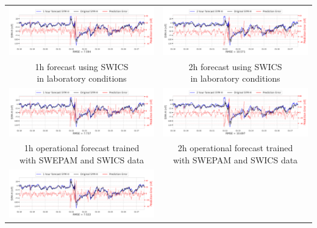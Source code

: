 \documentclass[draft,sw]{agutexSI2019}
\begin{document}
\begin{table}
\centering
\begin{tabular}{cc}
\includegraphics[width=0.49\linewidth]{paper_plots_shade/1h_swics/1h_swics_storm_36.png}
&
\includegraphics[width=0.49\linewidth]{paper_plots_shade/2h_swics/2h_swics_storm_36.png}
\\
\shortstack{1h forecast using SWICS\\ in laboratory conditions} & \shortstack{2h forecast using SWICS\\ in laboratory conditions}
\vspace*{12pt}
\\
\includegraphics[width=0.49\linewidth]{paper_plots_shade/1h_swics_rt/1h_swics_rt_storm_36.png}
&
\includegraphics[width=0.49\linewidth]{paper_plots_shade/2h_swics_rt/2h_swics_rt_storm_36.png}
\\
\shortstack{1h operational forecast trained\\ with SWEPAM and SWICS data} & \shortstack{2h operational forecast trained\\ with SWEPAM and SWICS data}
\vspace*{12pt}
\\
\includegraphics[width=0.49\linewidth]{paper_plots_shade/1h_swepam_rt/1h_swepam_rt_storm_36.png}

\end{tabular}
\end{table}
\end{document}

